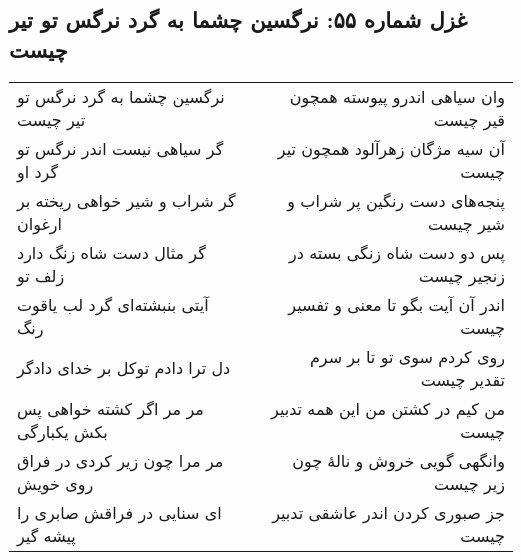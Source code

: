 \begin{center}
\section*{غزل شماره ۵۵: نرگسین چشما به گرد نرگس تو تیر چیست}
\label{sec:055}
\begin{longtable}{l p{0.5cm} r}
نرگسین چشما به گرد نرگس تو تیر چیست
&&
وان سیاهی اندرو پیوسته همچون قیر چیست
\\
گر سیاهی نیست اندر نرگس تو گرد او
&&
آن سیه مژگان زهرآلود همچون تیر چیست
\\
گر شراب و شیر خواهی ریخته بر ارغوان
&&
پنجه‌های دست رنگین پر شراب و شیر چیست
\\
گر مثال دست شاه زنگ دارد زلف تو
&&
پس دو دست شاه زنگی بسته در زنجیر چیست
\\
آیتی بنبشته‌ای گرد لب یاقوت رنگ
&&
اندر آن آیت بگو تا معنی و تفسیر چیست
\\
دل ترا دادم توکل بر خدای دادگر
&&
روی کردم سوی تو تا بر سرم تقدیر چیست
\\
مر مر اگر کشته خواهی پس بکش یکبارگی
&&
من کیم در کشتن من این همه تدبیر چیست
\\
مر مرا چون زیر کردی در فراق روی خویش
&&
وانگهی گویی خروش و نالهٔ چون زیر چیست
\\
ای سنایی در فراقش صابری را پیشه گیر
&&
جز صبوری کردن اندر عاشقی تدبیر چیست
\\
\end{longtable}
\end{center}
